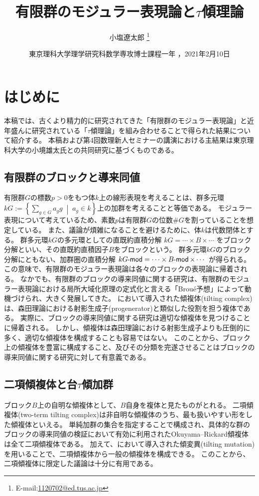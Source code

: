 \documentclass[a4paper,uplatex,dvipdfmx]{jsarticle}
\title{%
有限群のモジュラー表現論と\texorpdfstring{\(\tau\)}{τ}傾理論%
}
\author{%
小塩遼太郎%
\footnote{%
E-mail:\href{mailto:1120702@ed.tus.ac.jp}{1120702@ed.tus.ac.jp}
}}
\date{%
東京理科大学理学研究科数学専攻博士課程一年%
，2021年2月10日%
}
\theoremstyle{definition}
\newcommand{\setmid}{\; \middle|\;}
\newcommand{\lmod}{\operatorname{\mathsf{\hspace{-2pt}-mod}}}
\begin{document}
\maketitle
\tableofcontents

\section{はじめに}
本稿では、古くより精力的に研究されてきた「有限群のモジュラー表現論」と近年盛んに研究されている「\(\tau\)傾理論」を組み合わせることで得られた結果について紹介する。
本稿および第4回数理新人セミナーの講演における主結果は東京理科大学の小境雄太氏との共同研究に基づくものである。
\subsection{有限群のブロックと導来同値}
有限群\(G\)の標数\(p>0\)をもつ体\(k\)上の線形表現を考えることは、群多元環\(kG:=\left\{ \sum_{g \in G} a_g g \setmid a_g \in k \right\}\)上の加群を考えることと等価である。
モジュラー表現について考えているため、素数\(p\)は有限群\(G\)の位数\(\# G\)を割っていることを想定している。
また、議論が煩雑になることを避けるために、体\(k\)は代数閉体とする。
群多元環\(kG\)の多元環としての直既約直積分解
\(kG=\cdots \times B \times \cdots\)
をブロック分解といい、その直既約直積因子\(B\)をブロックという。
群多元環\(kG\)のブロック分解にともない、加群圏の直積分解
\(kG\lmod=\cdots \times B\lmod \times \cdots\)
が得られる。
この意味で、有限群のモジュラー表現論は各々のブロックの表現論に帰着される。
なかでも、有限群のブロックの導来同値に関する研究は、有限群のモジュラー表現論における局所大域化原理の定式化と言える「Brou\'{e}予想」によって動機づけられ、大きく発展してきた。
\cite{MR1002456}において導入された傾複体(tilting complex)は、森田理論における射影生成子(progenerator)と類似した役割を担う複体である。
実際に、ブロックの導来同値に関する研究は適切な傾複体を見つけることに帰着される。
しかし、傾複体は森田理論における射影生成子よりも圧倒的に多く、適切な傾複体を構成することも容易ではない。
このことから、ブロック上の傾複体を豊富に構成すること、及びその分類を完遂させることはブロックの導来同値に関する研究に対して有意義である。
\subsection{二項傾複体と台\texorpdfstring{\(\tau\)}{τ}傾加群}
ブロック\(B\)上の自明な傾複体として、\(B\)自身を複体と見たものがとれる。
二項傾複体(two-term tilting complex)は非自明な傾複体のうち、最も扱いやすい形をした傾複体といえる。
単純加群の集合を指定することで構成され、具体的な群のブロックの導来同値の検証において有効に利用されたOkuyama--Rickard傾複体は全て二項傾複体である\cite{okuyama1997some}。
加えて、\cite{MR2927802}において導入された傾変異(tilting mutation)を用いることで、二項傾複体から一般の傾複体を構成できる。
このことから、二項傾複体に限定した議論は十分に有用である。
\end{document}
